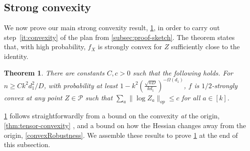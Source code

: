 \documentclass[aos]{imsart}
\newtheorem{theorem}{Theorem}[section]
\theoremstyle{definition}
\numberwithin{equation}{section}
\DeclareMathOperator{\PD}{PD}
\newcommand{\SPD}{\mathcal{P}}
\newcommand{\samp}{x}
\newcommand{\rv}{X}
\newcommand{\CF}[1]{{\color{purple}[CF: #1]}}
\begin{document}







\subsection{Strong convexity}\label{subsec:strong-convex}
We now prove our main strong convexity result, \cref{thm:ball-convexity}, in order to carry out step~\cref{it:convexity} of the plan from \cref{subsec:proof-sketch}. The theorem states that, with high probability, $f_X$ is strongly convex for $Z$ sufficiently close to the identity. 



\begin{theorem}\label{thm:ball-convexity} There are constants $C,c>0$ such that the following holds. For $n \geq C k^2 d_1^2/D$, with probability at least $1 - k^2 \left(\frac {\sqrt{nD}}{kd_1}\right)^{ - \Omega(d_1)}$, $f$ is $1/2$-strongly convex at any point $Z \in \SPD$ such that $\sum_a \|\log Z_a\|_{op} \leq c$ for all $a \in [k]$.
\end{theorem}


\cref{thm:ball-convexity} follows straightforwardly from a bound on the convexity \emph{at} the origin,  \cref{thm:tensor-convexity} , and a bound on how the Hessian changes away from the origin, \cref{convexRobustness}. We assemble these results to prove \cref{thm:ball-convexity} at the end of this subsection. %
\end{document}
